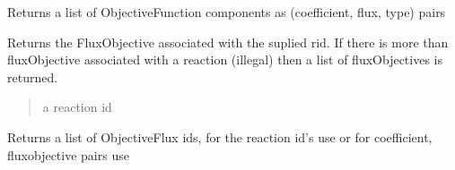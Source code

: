 \documentclass[letterpaper,10pt,english]{sphinxmanual}
\begin{document}
\begin{fulllineitems}

\begin{fulllineitems}
\label{\detokenize{modules_doc:cbmpy.CBModel.Objective.getFluxObjectiveData}}
\pysigstartsignatures
{}
\pysigstopsignatures
\sphinxAtStartPar
Returns a list of ObjectiveFunction components as (coefficient, flux, type) pairs

\end{fulllineitems}


\begin{fulllineitems}
\label{\detokenize{modules_doc:cbmpy.CBModel.Objective.getFluxObjectiveForReaction}}
\pysigstartsignatures
{}
\pysigstopsignatures
\sphinxAtStartPar
Returns the FluxObjective associated with the suplied rid. If there is more than fluxObjective associated with a reaction (illegal)
then a list of fluxObjectives is returned.
\begin{quote}

\sphinxAtStartPar
{} a reaction id
\end{quote}

\end{fulllineitems}


\begin{fulllineitems}
\label{\detokenize{modules_doc:cbmpy.CBModel.Objective.getFluxObjectiveIDs}}
\pysigstartsignatures
{}
\pysigstopsignatures
\sphinxAtStartPar
Returns a list of ObjectiveFlux ids, for the reaction id’s use 
or for coefficient, fluxobjective pairs use 

\end{fulllineitems}



\end{fulllineitems}
\end{document}
